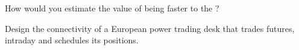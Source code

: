 \begin{interviewq}\label{iq:nw:power-commodities-and-betting-connectivity:5}
How would you estimate the value of being faster to the ?
\end{interviewq}

\begin{interviewq}\label{iq:nw:power-commodities-and-betting-connectivity:6}
Design the connectivity of a European power trading desk that trades futures, intraday and schedules its positions.
\end{interviewq}

